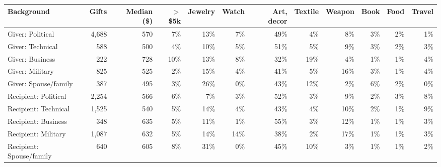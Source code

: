 \begin{tabular}{lrrrrrrrrrrr}
\toprule
Background & Gifts & Median (\$) & $>$\$5k & Jewelry & Watch & Art, decor & Textile & Weapon & Book & Food & Travel \\
\midrule
Giver: Political & 4,688 & 570 & 7\% & 13\% & 7\% & 49\% & 4\% & 8\% & 3\% & 2\% & 1\% \\
Giver: Technical & 588 & 500 & 4\% & 10\% & 5\% & 51\% & 5\% & 9\% & 3\% & 2\% & 3\% \\
Giver: Business & 222 & 728 & 10\% & 13\% & 8\% & 32\% & 19\% & 4\% & 1\% & 1\% & 4\% \\
Giver: Military & 825 & 525 & 2\% & 15\% & 4\% & 41\% & 5\% & 16\% & 3\% & 1\% & 4\% \\
Giver: Spouse/family & 387 & 495 & 3\% & 26\% & 0\% & 43\% & 12\% & 2\% & 6\% & 2\% & 0\% \\
Recipient: Political & 2,254 & 566 & 6\% & 7\% & 3\% & 52\% & 3\% & 9\% & 2\% & 3\% & 8\% \\
Recipient: Technical & 1,525 & 540 & 5\% & 14\% & 4\% & 43\% & 4\% & 10\% & 2\% & 1\% & 9\% \\
Recipient: Business & 348 & 635 & 5\% & 11\% & 1\% & 55\% & 3\% & 12\% & 1\% & 1\% & 3\% \\
Recipient: Military & 1,087 & 632 & 5\% & 14\% & 14\% & 38\% & 2\% & 17\% & 1\% & 1\% & 3\% \\
Recipient: Spouse/family & 640 & 605 & 8\% & 31\% & 0\% & 45\% & 10\% & 3\% & 1\% & 1\% & 2\% \\
\bottomrule
\end{tabular}
